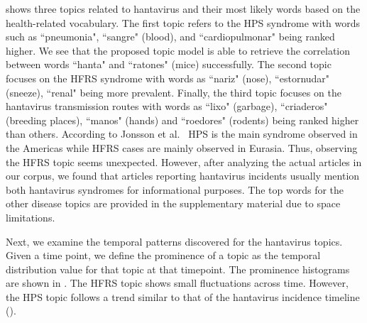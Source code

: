 \documentclass[twoside,leqno,twocolumn]{article}
\begin{document}
 shows three topics related to hantavirus and their most likely words based on the health-related vocabulary. 
The first topic refers to the HPS syndrome with words such as ``pneumonia", ``sangre" (blood), and ``cardiopulmonar" being ranked higher. We see that the proposed topic model is able to retrieve the correlation between words ``hanta" and ``ratones" (mice) successfully. The second topic focuses on the HFRS syndrome with words as  ``nariz" (nose), ``estornudar" (sneeze), ``renal" being more prevalent. Finally, the third topic focuses on the hantavirus transmission routes with words as ``lixo" (garbage), ``criaderos" (breeding places), ``manos" (hands) and ``roedores" (rodents) being ranked higher than others. According to Jonsson et al.~\cite{jonsson:10} HPS is the main syndrome observed in the Americas while HFRS cases are mainly observed in Eurasia. Thus, observing the HFRS topic seems unexpected. However, after analyzing the actual articles in our corpus, we found that articles reporting hantavirus incidents usually mention both hantavirus syndromes for informational purposes. The top words for the other disease topics are provided in the supplementary material due to space limitations.

Next, we examine the temporal patterns discovered for the hantavirus topics. Given a time point, we define the prominence of a topic as the temporal distribution value for that topic at that timepoint. The prominence histograms are shown in . The HFRS topic shows small fluctuations across time. However, the HPS topic follows a trend similar to that of the hantavirus incidence timeline (). 
\end{document}
